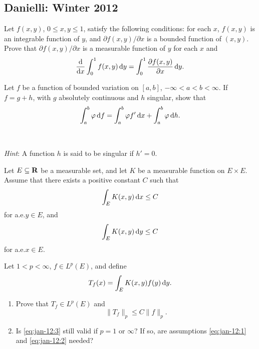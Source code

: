 \setcounter{exercise}{0}
\setcounter{equation}{0}
\subsection{Danielli: Winter 2012}
\begin{problem}
Let $f(x,y)$, $0\leq x,y\leq 1$, satisfy the following conditions: for each
$x$, $f(x,y)$ is an integrable function of $y$, and $\partial
f(x,y)/\partial x$ is a bounded function of $(x,y)$. Prove that $\partial
f(x,y)/\partial x$ is a measurable function of $y$ for each $x$ and
\[
\frac{\mathrm{d}}{\mathrm{d} x}\int_0^1f(x,y)\mathop{}\!\mathrm{d} y=
\int_0^1\frac{\partial f(x,y)}{\partial x}\mathop{}\!\mathrm{d} y.
\]
\end{problem}
\begin{solution}
\end{solution}

\begin{problem}
Let $f$ be a function of bounded variation on $[a,b]$,
$-\infty<a<b<\infty$. If $f=g+h$, with $g$ absolutely continuous and $h$
singular, show that
\[
\int_a^b\varphi\mathop{}\!\mathrm{d} f=\int_a^b\varphi f'\mathop{}\!\mathrm{d} x+\int_a^b\varphi\mathop{}\!\mathrm{d} h.
\]
\\\\
\emph{Hint}: A function $h$ is said to be singular if $h'=0$.
\end{problem}
\begin{solution}
\end{solution}

\begin{problem}
Let $E\subseteq\mathbf{R}$ be a measurable set, and let $K$ be a measurable
function on $E\times E$. Assume that there exists a positive constant $C$
such that
\begin{equation}
\label{eq:jan-12:1}
\int_E K(x,y)\mathop{}\!\mathrm{d} x\leq C
\end{equation}
for a.e.\@ $y\in E$, and
\begin{equation}
\label{eq:jan-12:2}
\int_E K(x,y)\mathop{}\!\mathrm{d} y\leq C
\end{equation}
for a.e.\@ $x\in E$.

Let $1<p<\infty$, $f\in L^p(E)$, and define
\[
T_f(x)=\int_E K(x,y)f(y)\mathop{}\!\mathrm{d} y.
\]
\begin{enumerate}[label=(\alph*),noitemsep]
\item Prove that $T_f\in L^p(E)$ and
\begin{equation}
\label{eq:jan-12:3}
\|T_f\|_p\leq C\|f\|_p.
\end{equation}
\item Is \eqref{eq:jan-12:3} still valid if $p=1$ or $\infty$? If so, are
  assumptions \eqref{eq:jan-12:1} and \eqref{eq:jan-12:2} needed?
\end{enumerate}
\end{problem}
\begin{solution}
\end{solution}

